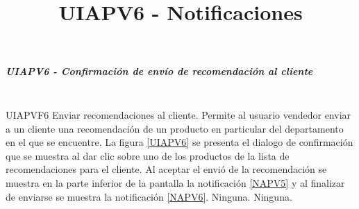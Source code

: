 \subparagraph{UIAPV6 - Confirmación de envío de recomendación al cliente} ~\\

{UIAPVF6} %
{Enviar recomendaciones al cliente.}  %
{Permite al usuario vendedor enviar a un cliente una recomendación de un producto en particular del departamento en el que se encuentre.} %
{La figura \ref{UIAPV6} se presenta el dialogo de confirmación que se muestra al dar clic sobre uno de los productos de la lista de recomendaciones para el cliente. Al aceptar el envió de la recomendación se muestra en la parte inferior de la pantalla la notificación \ref{NAPV5} y al finalizar de enviarse se muestra la notificación \ref{NAPV6}.} %
{Ninguna.} %
{Ninguna.} %


\newpage
\title{\textbf{UIAPV6 - Notificaciones}\\}

